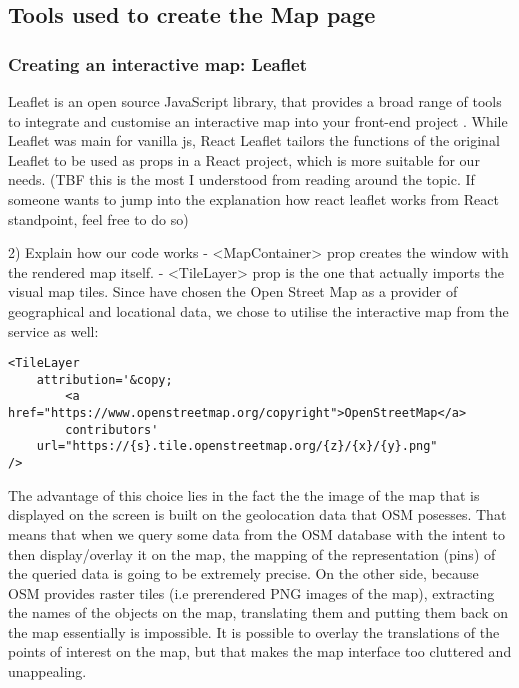 \subsection{Tools used to create the Map page}

\subsubsection{Creating an interactive map: Leaflet}

Leaflet is an open source JavaScript library, that provides a broad range of tools to integrate and customise an interactive map into your front-end project \cite{leafletMainPage}. While Leaflet was main for vanilla js, React Leaflet tailors the functions of the original Leaflet to be used as props in a React project, which is more suitable for our needs. (TBF this is the most I understood from reading around the topic. If someone wants to jump into the explanation how react leaflet works from React standpoint, feel free to do so)

2) Explain how our code works
- <MapContainer> prop creates the window with the rendered map itself.
- <TileLayer> prop is the one that actually imports the visual map tiles. Since have chosen the Open Street Map as a provider of geographical and locational data, we chose to utilise the interactive map from the service as well:
\begin{verbatim}
<TileLayer
    attribution='&copy; 
        <a href="https://www.openstreetmap.org/copyright">OpenStreetMap</a> 
        contributors'
    url="https://{s}.tile.openstreetmap.org/{z}/{x}/{y}.png"
/>
\end{verbatim}
The advantage of this choice lies in the fact the the image of the map that is displayed on the screen is built on the geolocation data that OSM posesses. That means that when we query some data from the OSM database with the intent to then display/overlay it on the map, the mapping of the representation (pins) of the queried data is going to be extremely precise. On the other side, because OSM provides raster tiles (i.e prerendered PNG images of the map), extracting the names of the objects on the map, translating them and putting them back on the map essentially is impossible. It is possible to overlay the translations of the points of interest on the map, but that makes the map interface too cluttered and unappealing.

